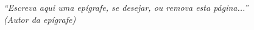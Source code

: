 \documentclass[
    12pt,                %
    oneside,            %
    a4paper,            %
    english,            %
    brazil                %
    ]{abntex2ppgsi}
\begin{document}
%
%
\begin{epigrafe}
    \vspace*{\fill}
    \begin{flushright}
        \textit{``Escreva aqui uma epígrafe, se desejar, ou remova esta página...''\\
        (Autor da epígrafe)}
    \end{flushright}
\end{epigrafe}

\end{document}

